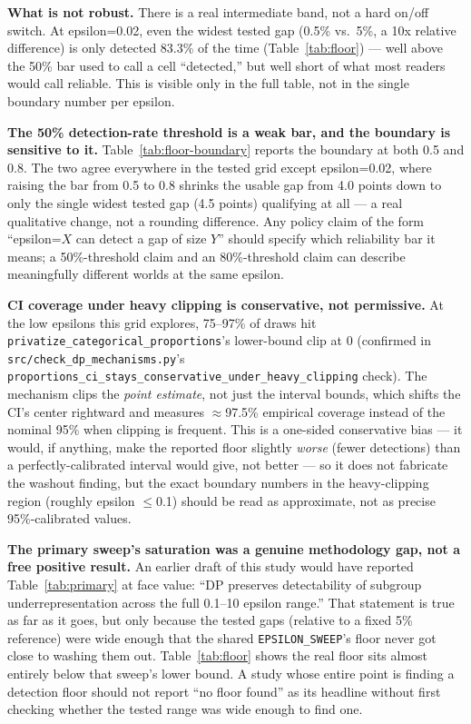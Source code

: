 \documentclass[11pt]{article}
\begin{document}
\textbf{What is not robust.} There is a real intermediate band, not a hard on/off switch. At epsilon=0.02, even the widest tested gap (0.5\% vs.\ 5\%, a 10x relative difference) is only detected 83.3\% of the time (Table~\ref{tab:floor}) --- well above the 50\% bar used to call a cell ``detected,'' but well short of what most readers would call reliable. This is visible only in the full table, not in the single boundary number per epsilon.

\textbf{The 50\% detection-rate threshold is a weak bar, and the boundary is sensitive to it.} Table~\ref{tab:floor-boundary} reports the boundary at both 0.5 and 0.8. The two agree everywhere in the tested grid except epsilon=0.02, where raising the bar from 0.5 to 0.8 shrinks the usable gap from 4.0 points down to only the single widest tested gap (4.5 points) qualifying at all --- a real qualitative change, not a rounding difference. Any policy claim of the form ``epsilon=$X$ can detect a gap of size $Y$'' should specify which reliability bar it means; a 50\%-threshold claim and an 80\%-threshold claim can describe meaningfully different worlds at the same epsilon.

\textbf{CI coverage under heavy clipping is conservative, not permissive.} At the low epsilons this grid explores, 75--97\% of draws hit \texttt{privatize\_categorical\_proportions}'s lower-bound clip at 0 (confirmed in \texttt{src/check\_dp\_mechanisms.py}'s \texttt{proportions\_ci\_stays\_conser\-vative\_under\_heavy\_clipping} check). The mechanism clips the \emph{point estimate}, not just the interval bounds, which shifts the CI's center rightward and measures $\approx$97.5\% empirical coverage instead of the nominal 95\% when clipping is frequent. This is a one-sided conservative bias --- it would, if anything, make the reported floor slightly \emph{worse} (fewer detections) than a perfectly-calibrated interval would give, not better --- so it does not fabricate the washout finding, but the exact boundary numbers in the heavy-clipping region (roughly epsilon $\leq$0.1) should be read as approximate, not as precise 95\%-calibrated values.

\textbf{The primary sweep's saturation was a genuine methodology gap, not a free positive result.} An earlier draft of this study would have reported Table~\ref{tab:primary} at face value: ``DP preserves detectability of subgroup underrepresentation across the full 0.1--10 epsilon range.'' That statement is true as far as it goes, but only because the tested gaps (relative to a fixed 5\% reference) were wide enough that the shared \texttt{EPSILON\_SWEEP}'s floor never got close to washing them out. Table~\ref{tab:floor} shows the real floor sits almost entirely below that sweep's lower bound. A study whose entire point is finding a detection floor should not report ``no floor found'' as its headline without first checking whether the tested range was wide enough to find one.
\end{document}
